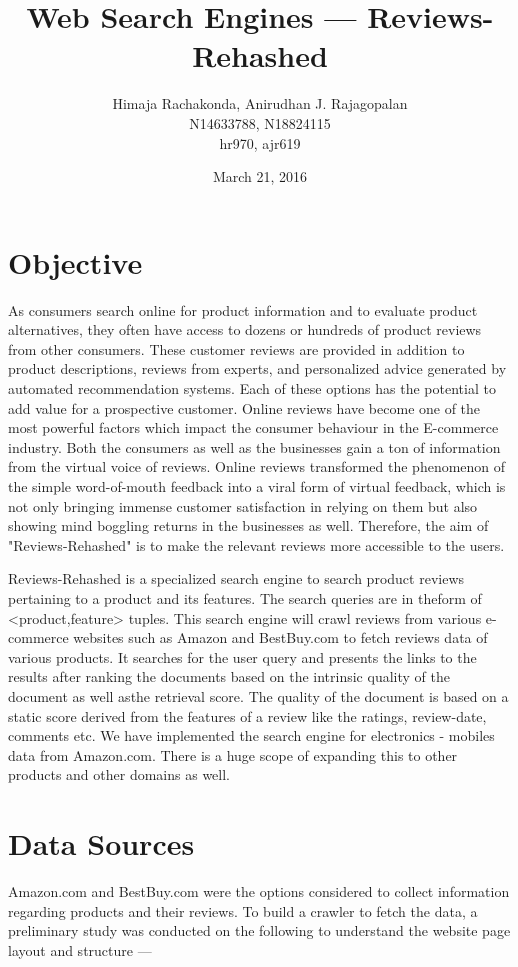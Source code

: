 \documentclass{article}
\begin{document}
\title{Web Search Engines --- Reviews-Rehashed}
\date{March 21, 2016}
\author{Himaja Rachakonda, Anirudhan J. Rajagopalan\\ N14633788, N18824115\\ hr970, ajr619}
\maketitle
\newpage

\section{Objective}

As consumers search online for product information and to evaluate product alternatives, they often have access to dozens or hundreds of product reviews from other consumers. These customer reviews are provided in addition to product descriptions, reviews from experts, and personalized advice generated by automated recommendation systems. Each of these options has the potential to add value for a prospective customer. Online reviews have become one of the most powerful factors which impact the consumer behaviour in the E-commerce industry. Both the consumers as well as the businesses gain a ton of information from the virtual voice of reviews. Online reviews transformed the phenomenon of the simple word-of-mouth feedback into a viral form of virtual feedback, which is not only bringing immense customer satisfaction in relying on them but also showing mind boggling returns in the businesses as well. Therefore, the aim of "Reviews-Rehashed" is to make the relevant reviews more accessible to the users. 

Reviews-Rehashed is a specialized search engine to search product reviews pertaining to a product and its features. The search queries are in theform of <product,feature> tuples. This search engine will crawl reviews from various e-commerce websites such as Amazon and BestBuy.com to fetch reviews data of various products. It searches for the user query and presents the links to the results after ranking the documents based on the intrinsic quality of the document as well asthe retrieval score. The quality of the document is based on a static score derived from the features of a review like the ratings, review-date, comments etc. We have implemented the search engine for electronics - mobiles data from Amazon.com. There is a huge scope of expanding this to other products and other domains as well.

\section{Data Sources}
Amazon.com and BestBuy.com were the options considered to collect information regarding products and their reviews. To build a crawler to fetch the data, a preliminary study was conducted on the following to understand the website page layout and structure ---
\end{document}
